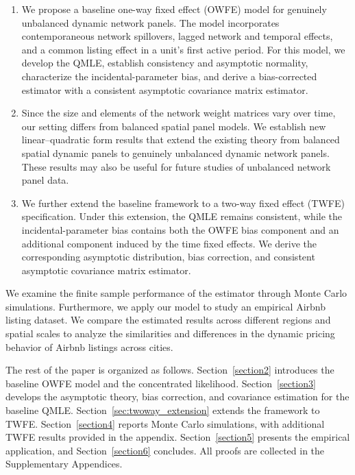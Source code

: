\documentclass[11pt,a4paper]{article}
\begin{document}
\begin{enumerate}
\item We propose a baseline one-way fixed effect (OWFE) model for genuinely unbalanced dynamic network panels. The model incorporates contemporaneous network spillovers, lagged network and temporal effects, and a common listing
effect in a unit's first active period. For this model, we develop the QMLE, establish consistency and asymptotic normality, characterize the incidental-parameter bias, and derive a bias-corrected estimator with a consistent asymptotic covariance matrix estimator.

\item Since the size and elements of the network weight matrices vary over time, our setting differs from balanced spatial panel models. We establish new linear--quadratic form results that extend the existing theory from balanced spatial dynamic panels to genuinely unbalanced dynamic network panels. These results may also be useful for future studies of unbalanced network panel data.

\item We further extend the baseline framework to a two-way fixed effect (TWFE) specification. Under this extension, the QMLE remains consistent, while the incidental-parameter bias contains both the OWFE bias component and an additional component induced by the time fixed effects. We derive the corresponding asymptotic distribution, bias correction, and consistent asymptotic covariance matrix estimator.
\end{enumerate}


We examine the finite sample performance of the estimator through Monte Carlo simulations. Furthermore, we apply our model to study an empirical Airbnb listing dataset. We compare the estimated results across different regions and spatial scales to analyze the similarities and differences in the dynamic pricing behavior of Airbnb listings across cities.



The rest of the paper is organized as follows. Section~\ref{section2}
introduces the baseline OWFE model and the concentrated likelihood. Section~\ref{section3}
develops the asymptotic theory, bias correction, and covariance estimation for
the baseline QMLE. Section~\ref{sec:twoway_extension} extends the framework to
TWFE. Section~\ref{section4} reports Monte Carlo simulations, with additional
TWFE results provided in the appendix. Section~\ref{section5} presents the
empirical application, and Section~\ref{section6} concludes. All proofs are
collected in the Supplementary Appendices.
\end{document}

